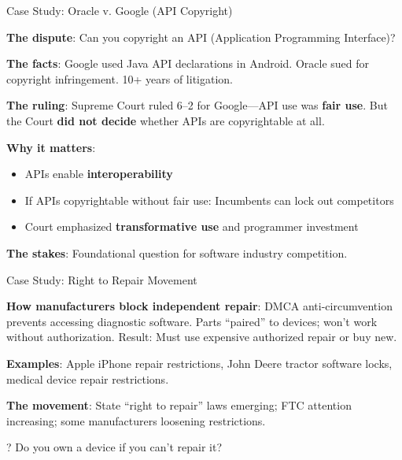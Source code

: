 \documentclass[aspectratio=169]{beamer}
\begin{document}
\begin{frame}{Case Study: Oracle v. Google (API Copyright)}
\begin{casestudybox}
\textbf{The dispute}: Can you copyright an API (Application Programming Interface)?

\textbf{The facts}: Google used Java API declarations in Android. Oracle sued for copyright infringement. 10+ years of litigation.

\textbf{The ruling}: Supreme Court ruled 6--2 for Google---API use was \textbf{fair use}. But the Court \textbf{did not decide} whether APIs are copyrightable at all.
\end{casestudybox}

\vspace{0.2cm}
\textbf{Why it matters}:
\begin{itemize}
    \item APIs enable \textbf{interoperability}
    \item If APIs copyrightable without fair use: Incumbents can lock out competitors
    \item Court emphasized \textbf{transformative use} and programmer investment
\end{itemize}

\textbf{The stakes}: Foundational question for software industry competition.
\end{frame}

\begin{frame}{Case Study: Right to Repair Movement}
\begin{casestudybox}
\textbf{How manufacturers block independent repair}: DMCA anti-circumvention prevents accessing diagnostic software. Parts ``paired'' to devices; won't work without authorization. Result: Must use expensive authorized repair or buy new.
\end{casestudybox}

\vspace{0.2cm}
\textbf{Examples}: Apple iPhone repair restrictions, John Deere tractor software locks, medical device repair restrictions.

\vspace{0.2cm}
\textbf{The movement}: State ``right to repair'' laws emerging; FTC attention increasing; some manufacturers loosening restrictions.

\begin{alertblock}{?}
Do you own a device if you can't repair it?
\end{alertblock}
\end{frame}
\end{document}

